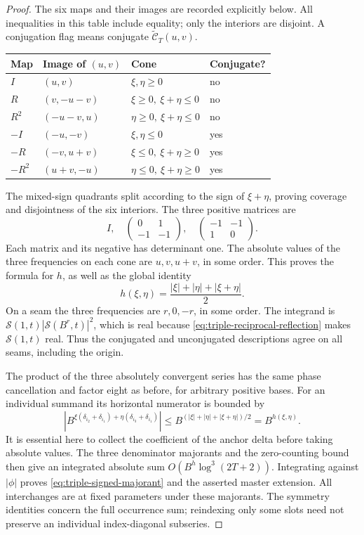 \documentclass[11pt]{article}
\newcommand{\ZS}{\mathcal S}
\begin{document}
\begin{proof}
The six maps and their images are recorded explicitly below. All
inequalities in this table include equality; only the interiors are
disjoint. A conjugation flag means conjugate \(\widetilde{\mathcal C}_T(u,v)\).
\begin{center}\small
\begin{tabular}{llll}
\toprule
Map & Image of \((u,v)\) & Cone & Conjugate?\\
\midrule
\(I\)&\((u,v)\)&\(\xi,\eta\geq0\)&no\\
\(R\)&\((v,-u-v)\)&\(\xi\geq0,\ \xi+\eta\leq0\)&no\\
\(R^2\)&\((-u-v,u)\)&\(\eta\geq0,\ \xi+\eta\leq0\)&no\\
\(-I\)&\((-u,-v)\)&\(\xi,\eta\leq0\)&yes\\
\(-R\)&\((-v,u+v)\)&\(\xi\leq0,\ \xi+\eta\geq0\)&yes\\
\(-R^2\)&\((u+v,-u)\)&\(\eta\leq0,\ \xi+\eta\geq0\)&yes\\
\bottomrule
\end{tabular}
\end{center}
The mixed-sign quadrants split according to the sign of \(\xi+\eta\),
proving coverage and disjointness of the six interiors. The three
positive matrices are
\[
 I,\quad \begin{pmatrix}0&1\\-1&-1\end{pmatrix},\quad
 \begin{pmatrix}-1&-1\\1&0\end{pmatrix}.
\]
Each matrix and its negative has determinant one. The absolute values
of the three frequencies on each cone are \(u,v,u+v\), in some order.
This proves the formula for \(h\), as well as the global identity
\begin{equation}\label{eq:triple-hexagon-gauge}
 h(\xi,\eta)=\frac{|\xi|+|\eta|+|\xi+\eta|}{2}.
\end{equation}
On a seam the three frequencies are \(r,0,-r\), in some order.
The integrand is \(\ZS(1,t)|\ZS(B^r,t)|^2\), which is real because
\eqref{eq:triple-reciprocal-reflection} makes \(\ZS(1,t)\) real.
Thus the conjugated and unconjugated descriptions agree on all seams,
including the origin.

The product of the three absolutely convergent series has the same
phase cancellation and factor eight as before, for arbitrary positive
bases. For an individual summand its horizontal numerator is bounded by
\[
 \left|B^{\xi(\delta_{i_2}+\delta_{i_1})+
                  \eta(\delta_{i_3}+\delta_{i_1})}\right|
 \leq B^{(|\xi|+|\eta|+|\xi+\eta|)/2}=B^{h(\xi,\eta)}.
\]
It is essential here to collect the coefficient of the anchor delta
before taking absolute values. The three denominator majorants and the
zero-counting bound then give an integrated absolute sum
\(O(B^h\log^3(2T+2))\). Integrating against \(|\phi|\) proves
\eqref{eq:triple-signed-majorant} and the asserted master extension.
All interchanges are at fixed parameters under these majorants.
The symmetry identities concern the full occurrence sum; reindexing
only some slots need not preserve an individual index-diagonal subseries.
\end{proof}
\end{document}
